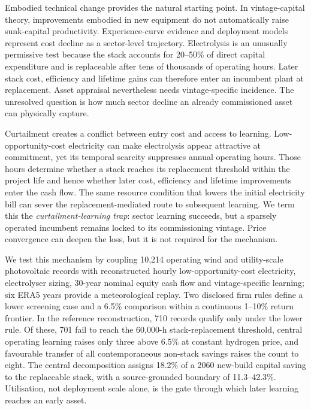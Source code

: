 \documentclass[pdflatex,sn-nature]{sn-jnl}
\begin{document}
Embodied technical change provides the natural starting point. In vintage-capital theory, improvements embodied in new equipment do not automatically raise sunk-capital productivity\cite{solow1960}. Experience-curve evidence and deployment models represent cost decline as a sector-level trajectory\cite{wright1936,arrow1962,mcdonald2001,nemet2006,ferioli2009,rubin2015,farmer2016,way2022,schmidt2017,brandt2024,song2021,glenk2023,irena2020,doe2024,worldbank2026,odenweller2022,zeyen2023,odenweller2025}. Electrolysis is an unusually permissive test because the stack accounts for 20--50\% of direct capital expenditure and is replaceable after tens of thousands of operating hours. Later stack cost, efficiency and lifetime gains can therefore enter an incumbent plant at replacement. Asset appraisal nevertheless needs vintage-specific incidence. The unresolved question is how much sector decline an already commissioned asset can physically capture.

Curtailment creates a conflict between entry cost and access to learning\cite{glenk2019,fan2025,nea2025hydrogen}. Low-opportunity-cost electricity can make electrolysis appear attractive at commitment, yet its temporal scarcity suppresses annual operating hours. Those hours determine whether a stack reaches its replacement threshold within the project life and hence whether later cost, efficiency and lifetime improvements enter the cash flow. The same resource condition that lowers the initial electricity bill can sever the replacement-mediated route to subsequent learning. We term this the \emph{curtailment-learning trap}: sector learning succeeds, but a sparsely operated incumbent remains locked to its commissioning vintage. Price convergence can deepen the loss, but it is not required for the mechanism.

We test this mechanism by coupling 10,214 operating wind and utility-scale photovoltaic records with reconstructed hourly low-opportunity-cost electricity, electrolyser sizing, 30-year nominal equity cash flow and vintage-specific learning; six ERA5 years provide a meteorological replay. Two disclosed firm rules define a lower screening case and a 6.5\% comparison within a continuous 1--10\% return frontier\cite{changyuan2026,chinabond2026,huadian2025}. In the reference reconstruction, 710 records qualify only under the lower rule. Of these, 701 fail to reach the 60,000-h stack-replacement threshold, central operating learning raises only three above 6.5\% at constant hydrogen price, and favourable transfer of all contemporaneous non-stack savings raises the count to eight. The central decomposition assigns 18.2\% of a 2060 new-build capital saving to the replaceable stack, with a source-grounded boundary of 11.3--42.3\%. Utilisation, not deployment scale alone, is the gate through which later learning reaches an early asset.
\end{document}

